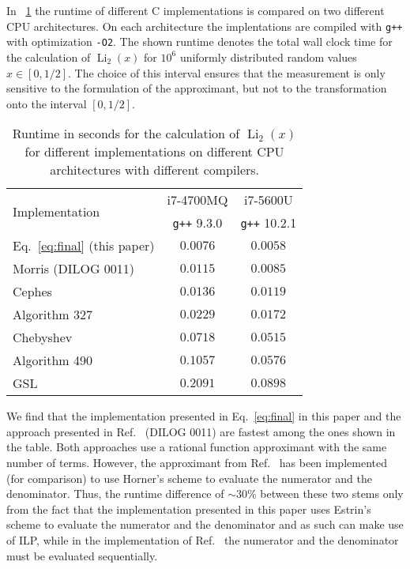 \documentclass[10pt,DIV16,twocolumn,numbers=noenddot]{scrartcl}
\newcommand{\Li}{\operatorname{Li}_2}
\newcommand{\tabref}[1]{\tablename~\ref{#1}}
\begin{document}
In \tabref{tab:runtime} the runtime of different C implementations is
compared on two different CPU architectures.  On each architecture the
implentations are compiled with \texttt{g++} with optimization
\texttt{-O2}.  The shown runtime denotes the total wall clock time for
the calculation of $\Li(x)$ for $10^6$ uniformly distributed random
values $x\in[0,1/2]$.  The choice of this interval ensures that the
measurement is only sensitive to the formulation of the approximant,
but not to the transformation onto the interval $[0,1/2]$.
%
\begin{table}[tb]
  \centering
  \caption{Runtime in seconds for the calculation of $\Li(x)$ for
    different implementations on different CPU architectures with
    different compilers.}
  \begin{tabular}{lcc}
    \toprule
    \multirow{2}{*}{Implementation} & i7-4700MQ & i7-5600U \\
    & \texttt{g++} 9.3.0 & \texttt{g++} 10.2.1 \\
    \midrule
    Eq.~\eqref{eq:final} (this paper) & $0.0076$ & $0.0058$ \\
    Morris (DILOG 0011) \cite{morris} & $0.0115$ & $0.0085$ \\
    Cephes \cite{cephes}              & $0.0136$ & $0.0119$ \\
    Algorithm 327 \cite{koelbigDilog} & $0.0229$ & $0.0172$ \\
    Chebyshev \cite{luke}             & $0.0718$ & $0.0515$ \\
    Algorithm 490 \cite{ginsberg}     & $0.1057$ & $0.0576$ \\
    GSL \cite{gsl}                    & $0.2091$ & $0.0898$ \\
    \bottomrule
  \end{tabular}
  \label{tab:runtime}
\end{table}
%
We find that the implementation presented in Eq.~\eqref{eq:final} in
this paper and the approach presented in Ref.~\cite{morris} (DILOG
0011) are fastest among the ones shown in the table.  Both approaches
use a rational function approximant with the same number of terms.
However, the approximant from Ref.~\cite{morris} has been implemented
(for comparison) to use Horner's scheme to evaluate the numerator and
the denominator.  Thus, the runtime difference of $\sim 30\%$ between
these two stems only from the fact that the implementation presented
in this paper uses Estrin's scheme to evaluate the numerator and the
denominator and as such can make use of ILP, while in the
implementation of Ref.~\cite{morris} the numerator and the denominator
must be evaluated sequentially.
\end{document}
